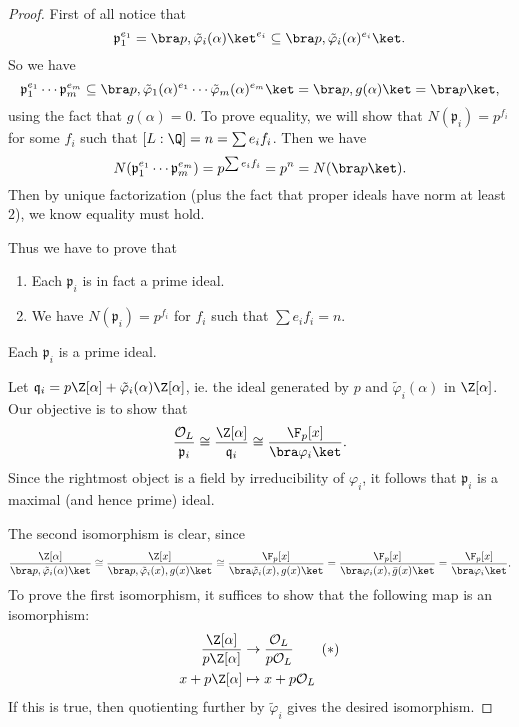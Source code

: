 \documentclass[a4paper]{article}
\begin{document}
\begin{proof}
  First of all notice that
  \[
    \mathfrak{p}_1^{e_1} = \bra p, \tilde{\varphi}_i(\alpha)\ket^{e_i} \subseteq \bra p, \tilde{\varphi}_i(\alpha)^{e_i}\ket.
  \]
  So we have
  \[
    \mathfrak{p}_1^{e_1} \cdots \mathfrak{p}_m^{e_m} \subseteq \bra p, \tilde{\varphi}_1(\alpha)^{e_1} \cdots \tilde{\varphi}_m(\alpha)^{e_m}\ket = \bra p, g(\alpha)\ket = \bra p\ket,
  \]
  using the fact that $g(\alpha) = 0$. To prove equality, we will show that $N(\mathfrak{p}_i) = p^{f_i}$ for some $f_i$ such that $[L:\Q] = n = \sum e_i f_i$. Then we have
  \[
    N(\mathfrak{p}_1^{e_1} \cdots \mathfrak{p}_m^{e_m}) = p^{\sum e_i f_i} = p^n = N(\bra p\ket).
  \]
  Then by unique factorization (plus the fact that proper ideals have norm at least $2$), we know equality must hold.

  Thus we have to prove that
  \begin{enumerate}
    \item Each $\mathfrak{p}_i$ is in fact a prime ideal.
    \item We have $N(\mathfrak{p}_i) = p^{f_i}$ for $f_i$ such that $\sum e_i f_i = n$.
  \end{enumerate}
  \begin{claim}
    Each $\mathfrak{p}_i$ is a prime ideal.
  \end{claim}

  Let $\mathfrak{q}_i = p \Z[\alpha] + \tilde{\varphi}_i(\alpha)\Z[\alpha]$, ie. the ideal generated by $p$ and $\tilde{\varphi}_i (\alpha)$ in $\Z[\alpha]$. Our objective is to show that
  \[
    \frac{\mathcal{O}_L}{\mathfrak{p}_i} \cong \frac{\Z[\alpha]}{\mathfrak{q}_i} \cong \frac{\F_p[x]}{\bra\varphi_i\ket}.
  \]
  Since the rightmost object is a field by irreducibility of $\varphi_i$, it follows that $\mathfrak{p}_i$ is a maximal (and hence prime) ideal.

  The second isomorphism is clear, since
  \[
    \frac{\Z[\alpha]}{\bra p, \tilde{\varphi}_i(\alpha)\ket} \cong \frac{\Z[x]}{\bra p, \tilde{\varphi}_i(x), g(x)\ket} \cong \frac{\F_p[x]}{\bra \tilde{\varphi}_i(x), g(x)\ket} = \frac{\F_p[x]}{\bra \varphi_i(x), \bar{g}(x)\ket} = \frac{\F_p[x]}{\bra \varphi_i\ket}.
  \]
  To prove the first isomorphism, it suffices to show that the following map is an isomorphism:
  \begin{align*}
    \frac{\Z[\alpha]}{p\Z[\alpha]} &\to \frac{\mathcal{O}_L}{p\mathcal{O}_L}\tag{$*$}\\
    x + p\Z[\alpha] &\mapsto x + p \mathcal{O}_L
  \end{align*}
  If this is true, then quotienting further by $\tilde{\varphi}_i$ gives the desired isomorphism.


\end{proof}
\end{document}
